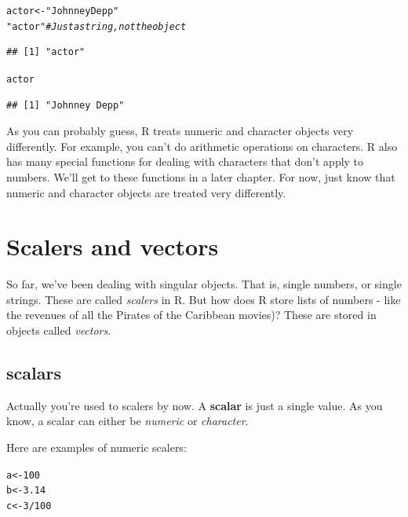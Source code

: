 \documentclass{tufte-book}\usepackage[]{graphicx}\usepackage[]{color}
\makeatletter
\newcommand{\hlnum}[1]{\textcolor[rgb]{0.686,0.059,0.569}{#1}}%
\newcommand{\hlstr}[1]{\textcolor[rgb]{0.192,0.494,0.8}{#1}}%
\newcommand{\hlcom}[1]{\textcolor[rgb]{0.678,0.584,0.686}{\textit{#1}}}%
\newcommand{\hlopt}[1]{\textcolor[rgb]{0,0,0}{#1}}%
\newcommand{\hlstd}[1]{\textcolor[rgb]{0.345,0.345,0.345}{#1}}%
\newcommand{\hlkwb}[1]{\textcolor[rgb]{0.69,0.353,0.396}{#1}}%
\newenvironment{kframe}{%
 \def\at@end@of@kframe{}%
 \ifinner\ifhmode%
  \def\at@end@of@kframe{\end{minipage}}%
  \begin{minipage}{\columnwidth}%
 \fi\fi%
 \def\FrameCommand##1{\hskip\@totalleftmargin \hskip-\fboxsep
 \colorbox{shadecolor}{##1}\hskip-\fboxsep
     \hskip-\linewidth \hskip-\@totalleftmargin \hskip\columnwidth}%
 \MakeFramed {\advance\hsize-\width
   \@totalleftmargin\z@ \linewidth\hsize
   \@setminipage}}%
 {\par\unskip\endMakeFramed%
 \at@end@of@kframe}
\newenvironment{knitrout}{}{} %
\makeatother
\begin{document}
\begin{marginfigure}

\begin{knitrout}
\color{fgcolor}\begin{kframe}
\begin{alltt}
\hlstd{actor} \hlkwb{<-} \hlstr{"Johnney Depp"}
\hlstr{"actor"} \hlcom{# Just a string, not the object}
\end{alltt}
\begin{verbatim}
## [1] "actor"
\end{verbatim}
\begin{alltt}
\hlstd{actor}
\end{alltt}
\begin{verbatim}
## [1] "Johnney Depp"
\end{verbatim}
\end{kframe}
\end{knitrout}

\end{marginfigure}

As you can probably guess, R treats numeric and character objects very differently. For example, you can't do arithmetic operations on characters. R also has many special functions for dealing with characters that don't apply to numbers. We'll get to these functions in a later chapter. For now, just know that numeric and character objects are treated very differently.

\section{Scalers and vectors}

So far, we've been dealing with singular objects. That is, single numbers, or single strings. These are called \textit{scalers} in R. But how does R store lists of numbers - like the revenues of all the Pirates of the Caribbean movies)? These are stored in objects called \textit{vectors}.

\subsection{scalars}

Actually you're used to scalers by now. A \textbf{scalar} is just a single value. As you know, a scalar can either be \textit{numeric} or \textit{character}.

Here are examples of numeric scalers:

\begin{knitrout}
\color{fgcolor}\begin{kframe}
\begin{alltt}
\hlstd{a} \hlkwb{<-} \hlnum{100}
\hlstd{b} \hlkwb{<-} \hlnum{3.14}
\hlstd{c} \hlkwb{<-} \hlnum{3} \hlopt{/} \hlnum{100}
\end{alltt}
\end{kframe}
\end{knitrout}
\end{document}
